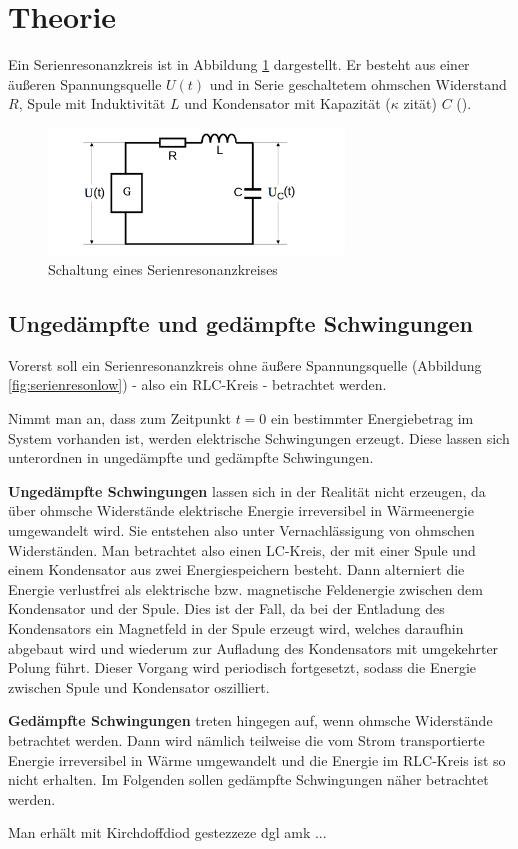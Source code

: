 \section{Theorie}
\label{sec:Theorie}


Ein Serienresonanzkreis ist in Abbildung \ref{fig:serienreson} dargestellt.
Er besteht aus einer äußeren Spannungsquelle $U(t)$ und in Serie 
geschaltetem ohmschen Widerstand $R$, Spule mit Induktivität $L$ und Kondensator 
mit Kapazität ($\kappa$ zität) $C$ (\cite{noltingbro}).

\begin{figure}
	\centering
	\includegraphics[width=0.7\textwidth]{Bilder/Aufbau.png}
	\caption{Schaltung eines Serienresonanzkreises \cite{Anleitung}}
	\label{fig:serienreson}
\end{figure}


\subsection{Ungedämpfte und gedämpfte Schwingungen}

Vorerst soll ein Serienresonanzkreis ohne äußere Spannungsquelle (Abbildung \ref{fig:serienresonlow}) - also ein RLC-Kreis - betrachtet werden.

Nimmt man an, dass zum Zeitpunkt $t=0$ ein bestimmter Energiebetrag im System vorhanden ist, 
werden elektrische Schwingungen erzeugt.
Diese lassen sich unterordnen in ungedämpfte und gedämpfte Schwingungen.

\textbf{Ungedämpfte Schwingungen} lassen sich in der Realität nicht erzeugen, da über ohmsche 
Widerstände elektrische Energie irreversibel in Wärmeenergie umgewandelt wird.
Sie entstehen also unter Vernachlässigung von ohmschen Widerständen.
Man betrachtet also einen LC-Kreis, der mit einer Spule und einem Kondensator aus zwei 
Energiespeichern besteht. 
Dann alterniert die Energie verlustfrei als elektrische bzw. magnetische Feldenergie zwischen dem Kondensator und der Spule. 
Dies ist der Fall, da bei der Entladung des Kondensators ein Magnetfeld in der Spule erzeugt 
wird, welches daraufhin abgebaut wird und wiederum zur Aufladung des Kondensators mit 
umgekehrter Polung führt. Dieser Vorgang wird periodisch fortgesetzt, sodass die Energie zwischen Spule und Kondensator oszilliert.

\textbf{Gedämpfte Schwingungen} treten hingegen auf, wenn ohmsche Widerstände betrachtet werden. 
Dann wird nämlich teilweise die vom Strom transportierte Energie irreversibel in Wärme 
umgewandelt und die Energie im RLC-Kreis ist so nicht erhalten. Im Folgenden sollen gedämpfte 
Schwingungen näher betrachtet werden.

Man erhält mit Kirchdoffdiod gestezzeze dgl amk ...





\cite{Anleitung}
